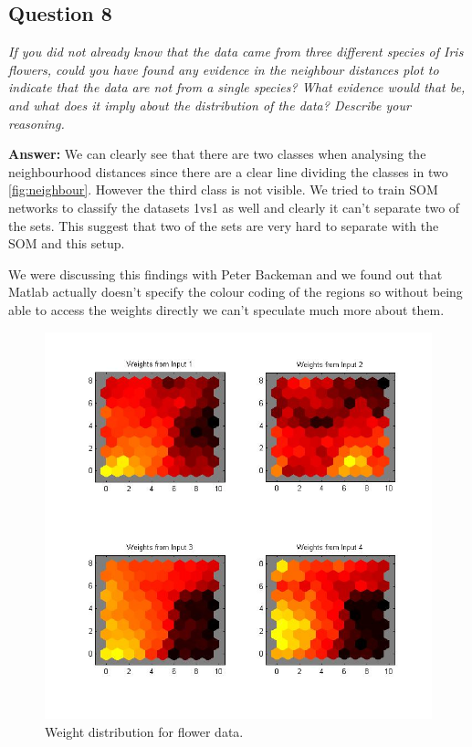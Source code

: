 \documentclass[a4paper]{article}
\begin{document}
\subsection*{Question 8}
\emph{If you did not already know that the data came from three different species of Iris flowers, could you have found any evidence in the neighbour distances plot to indicate that the data are not from a single species? What evidence would that be, and what does it imply about the distribution of the data?
Describe your reasoning.}

\textbf{Answer:} We can clearly see that there are two classes when analysing the neighbourhood distances since there are a clear line dividing the classes in two \ref{fig:neighbour}. However the third class is not visible. We tried to train SOM networks to classify the datasets 1vs1 as well and clearly it can't separate two of the sets. This suggest that two of the sets are very hard to separate with the SOM and this setup. 

We were discussing this findings with Peter Backeman and we found out that Matlab actually doesn't specify the colour coding of the regions so without being able to access the weights directly we can't speculate much more about them. 



  \begin{figure}[H] %
	 \includegraphics[scale=0.7]{q4_q9weightdistribution.jpg}
	 \caption{\label{fig:weightdist} Weight distribution for flower data.}
 \end{figure}
\end{document}
